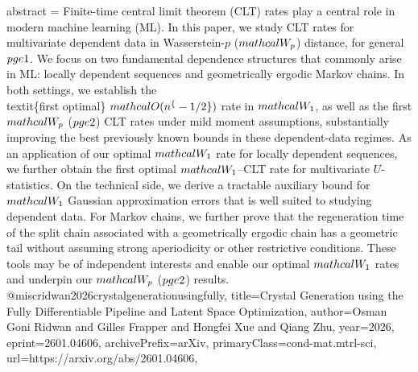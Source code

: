 {      abstract = {Finite-time central limit theorem (CLT) rates play a central role in modern machine learning (ML). In this paper, we study CLT rates for multivariate dependent data in Wasserstein-$p$ ($\\mathcal W_p$) distance, for general $p\\ge 1$. We focus on two fundamental dependence structures that commonly arise in ML: locally dependent sequences and geometrically ergodic Markov chains. In both settings, we establish the \\textit\{first optimal\} $\\mathcal O(n^\{-1/2\})$ rate in $\\mathcal W_1$, as well as the first $\\mathcal W_p$ ($p\\ge 2$) CLT rates under mild moment assumptions, substantially improving the best previously known bounds in these dependent-data regimes. As an application of our optimal $\\mathcal W_1$ rate for locally dependent sequences, we further obtain the first optimal $\\mathcal W_1$--CLT rate for multivariate $U$-statistics.   On the technical side, we derive a tractable auxiliary bound for $\\mathcal W_1$ Gaussian approximation errors that is well suited to studying dependent data. For Markov chains, we further prove that the regeneration time of the split chain associated with a geometrically ergodic chain has a geometric tail without assuming strong aperiodicity or other restrictive conditions. These tools may be of independent interests and enable our optimal $\\mathcal W_1$ rates and underpin our $\\mathcal W_p$ ($p\\ge 2$) results.}
}@misc{ridwan2026crystalgenerationusingfully,
      title={Crystal Generation using the Fully Differentiable Pipeline and Latent Space Optimization}, 
      author={Osman Goni Ridwan and Gilles Frapper and Hongfei Xue and Qiang Zhu},
      year={2026},
      eprint={2601.04606},
      archivePrefix={arXiv},
      primaryClass={cond-mat.mtrl-sci},
      url={https://arxiv.org/abs/2601.04606},
}
